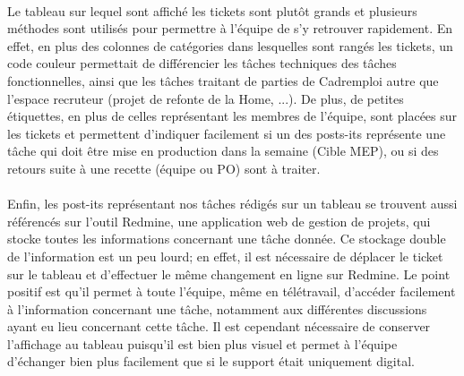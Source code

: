 \paragraph{}
Le tableau sur lequel sont affiché les tickets sont plutôt grands et plusieurs méthodes sont utilisés pour permettre à l'équipe de s'y retrouver rapidement.
En effet, en plus des colonnes de catégories dans lesquelles sont rangés les tickets, un code couleur permettait de différencier les tâches techniques des tâches fonctionnelles, ainsi que les tâches traitant de parties de Cadremploi autre que l'espace recruteur (projet de refonte de la Home, ...).
De plus, de petites étiquettes, en plus de celles représentant les membres de l'équipe, sont placées sur les tickets et permettent d'indiquer facilement si un des posts-its représente une tâche qui doit être mise en production dans la semaine (Cible MEP), ou si des retours suite à une recette (équipe ou PO) sont à traiter.
\paragraph{}
Enfin, les post-its représentant nos tâches rédigés sur un tableau se trouvent aussi référencés sur l'outil Redmine, une application web de gestion de projets, qui stocke toutes les informations concernant une tâche donnée.
Ce stockage double de l'information est un peu lourd; en effet, il est nécessaire de déplacer le ticket sur le tableau et d'effectuer le même changement en ligne sur Redmine.
Le point positif est qu'il permet à toute l'équipe, même en télétravail, d'accéder facilement à l'information concernant une tâche, notamment aux différentes discussions ayant eu lieu concernant cette tâche.
Il est cependant nécessaire de conserver l'affichage au tableau puisqu'il est bien plus visuel et permet à l'équipe d'échanger bien plus facilement que si le support était uniquement digital.
